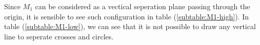\documentclass[12pt]{article}
\newenvironment{question}[2][Question]{\begin{trivlist}
\kern10pt
\item[\hskip \labelsep {\bfseries #1}\hskip \labelsep {\bfseries #2.}]}{\end{trivlist}}
\begin{document}
\begin{question}{23}
\begin{table}[h]
    \centering
    \hspace{1cm}
  \caption{The highest and lowest evident data set for $M_1$}
  \label{table:M1}
\end{table}
Since $M_1$ can be considered as a vectical seperation plane passing through the
origin, it is sensible to see such configuration in table
(\ref{subtable:M1-high}).
In table (\ref{subtable:M1-low}), we can see that it is not possible to draw any
vertical line to seperate crosses and circles.


\end{question}
\end{document}
